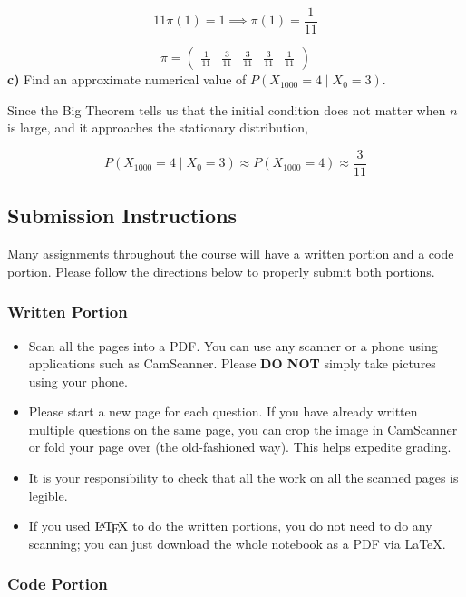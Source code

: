 \documentclass[11pt]{article}
\providecommand{\tightlist}{%
      \setlength{\itemsep}{0pt}\setlength{\parskip}{0pt}}
\let\Oldlatex\LaTeX
\renewcommand{\LaTeX}{\textrm{\Oldlatex}}
\begin{document}
\[
11\pi(1) = 1 \implies \pi(1) = \frac{1}{11}
\]

\[
\pi = \begin{pmatrix}
	\frac{1}{11} &\frac{3}{11} &\frac{3}{11} &\frac{3}{11} &\frac{1}{11}
\end{pmatrix}
\]
\textbf{c)} Find an approximate numerical value of
\(P(X_{1000} = 4 \mid X_0 = 3)\).

Since the Big Theorem tells us that the initial condition does not matter when $ n $ is large, and it approaches the stationary distribution, 

\[
P(X_{1000} = 4 \mid X_{0} = 3) \approx P(X_{1000}=4) \approx \frac{3}{11}
\]
    \newpage

    \subsection{Submission Instructions}\label{submission-instructions}

Many assignments throughout the course will have a written portion and a
code portion. Please follow the directions below to properly submit both
portions.

\subsubsection{Written Portion}\label{written-portion}

\begin{itemize}
\tightlist
\item
  Scan all the pages into a PDF. You can use any scanner or a phone
  using applications such as CamScanner. Please \textbf{DO NOT} simply
  take pictures using your phone.
\item
  Please start a new page for each question. If you have already written
  multiple questions on the same page, you can crop the image in
  CamScanner or fold your page over (the old-fashioned way). This helps
  expedite grading.
\item
  It is your responsibility to check that all the work on all the
  scanned pages is legible.
\item
  If you used \(\LaTeX\) to do the written portions, you do not need to
  do any scanning; you can just download the whole notebook as a PDF via
  LaTeX.
\end{itemize}

\subsubsection{Code Portion}\label{code-portion}
\end{document}
